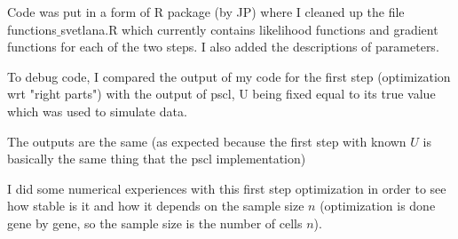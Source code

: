 \documentclass[12pt,a4paper]{article}
\begin{document}
\bigskip
\noindent Code was put in a form of R package (by JP) where I cleaned up the file functions$\_$svetlana.R which currently contains likelihood functions and gradient functions for each of 
the two steps. I also added the descriptions of parameters.

\bigskip
\noindent  To debug code, I compared the output of my code for the first step (optimization wrt "right parts") with the output of pscl, U being fixed equal to its true value which was used to simulate data.

\bigskip
\noindent  The outputs are the same (as expected because the first step with known $U$ is basically the same thing that the pscl implementation)

\bigskip
\noindent  I did some numerical experiences with this first step optimization in order to see how stable is it and how it depends on the sample size $n$ (optimization is done gene by gene, so the sample size is the number of cells $n$).
\end{document}
